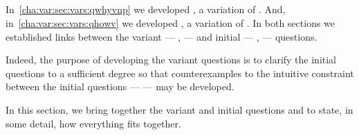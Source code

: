\subsection{\issueConstraint{}}
\label{cha:var:sec:vars:issue}

\begin{note}
  In~\autoref{cha:var:sec:vars:qwhyvnp} we developed \qWhyVnP{}, a variation of \qWhy{}.
  And, in~\autoref{cha:var:sec:vars:qhowv} we developed \qHowV{}, a variation of \qHow{}.
  In both sections we established links between the variant --- \qWhyVnP{}, \qHowV{}  --- and initial --- \qWhy{}, \qHow{} --- questions.

  Indeed, the purpose of developing the variant questions is to clarify the initial questions to a sufficient degree so that counterexamples to the intuitive constraint between the initial questions --- \issueInclusion{} --- may be developed.

  In this section, we bring together the variant and initial questions and \issueInclusion{} to state, in some detail, how everything fits together.
\end{note}

